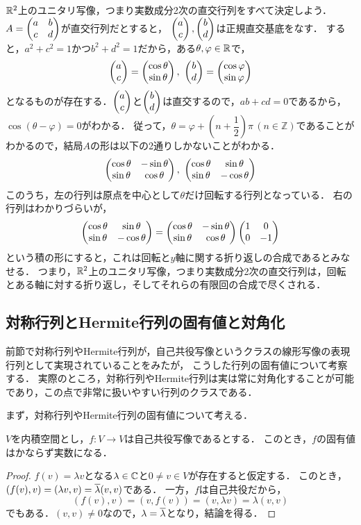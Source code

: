 \begin{example}
$\mathbb{R}^2$上のユニタリ写像，つまり実数成分2次の直交行列をすべて決定しよう．
$A=\begin{pmatrix} a & b \\ c & d \end{pmatrix}$が直交行列だとすると，
$\begin{pmatrix} a \\ c \end{pmatrix}, \begin{pmatrix} b \\ d \end{pmatrix}$は正規直交基底をなす．
すると，$a^2 + c^2 = 1$かつ$b^2 + d^2 = 1$だから，ある$\theta,\varphi \in \mathbb{R}$で，
\[
  \begin{pmatrix} a \\ c \end{pmatrix} = \begin{pmatrix} \cos \theta \\ \sin \theta \end{pmatrix},\  \begin{pmatrix} b \\ d \end{pmatrix} = \begin{pmatrix} \cos \varphi \\ \sin \varphi \end{pmatrix}  
\]
となるものが存在する．$\begin{pmatrix} a\\c \end{pmatrix}$と$\begin{pmatrix} b\\d \end{pmatrix}$は直交するので，$ab+cd = 0$であるから，$\cos(\theta - \varphi) = 0$がわかる．
従って，$\theta = \varphi + \left( n + \dfrac{1}{2} \right) \pi\,(n \in \mathbb{Z})$であることがわかるので，結局$A$の形は以下の2通りしかないことがわかる．
\[
  \begin{pmatrix} \cos \theta & -\sin \theta \\ \sin \theta & \cos \theta \end{pmatrix},\ \begin{pmatrix} \cos \theta & \sin \theta \\ \sin \theta & -\cos \theta \end{pmatrix}
\]
このうち，左の行列は原点を中心として$\theta$だけ回転する行列となっている．
右の行列はわかりづらいが，
\[
  \begin{pmatrix} \cos \theta & \sin \theta \\ \sin \theta & -\cos \theta \end{pmatrix} = \begin{pmatrix} \cos \theta & -\sin \theta \\ \sin \theta & \cos \theta \end{pmatrix} \begin{pmatrix} 1 & 0 \\ 0 & -1 \end{pmatrix} 
\]
という積の形にすると，これは回転と$y$軸に関する折り返しの合成であるとみなせる．
つまり，$\mathbb{R}^2$上のユニタリ写像，つまり実数成分2次の直交行列は，回転とある軸に対する折り返し，そしてそれらの有限回の合成で尽くされる．
\end{example}
\subsection{対称行列とHermite行列の固有値と対角化}
前節で対称行列やHermite行列が，自己共役写像というクラスの線形写像の表現行列として実現されていることをみたが，
こうした行列の固有値について考察する．
実際のところ，対称行列やHermite行列は実は常に対角化することが可能であり，この点で非常に扱いやすい行列のクラスである．

まず，対称行列やHermite行列の固有値について考える．
\begin{prop}
  $V$を内積空間とし，$f \colon V \to V$は自己共役写像であるとする．
  このとき，$f$の固有値はかならず実数になる．
\end{prop}
\begin{proof}
$f(v)=\lambda v$となる$\lambda \in \mathbb{C}$と$0 \neq v \in V$が存在すると仮定する．
このとき，$(f(v),v)=(\lambda v,v) = \overline{\lambda}(v,v)$である．
一方，$f$は自己共役だから，
\[
  (f(v),v) = (v,f(v)) = (v,\lambda v) = \lambda (v,v)
\]
でもある．$(v,v) \neq 0$なので，$\lambda = \overline{\lambda}$となり，結論を得る．
\end{proof}

